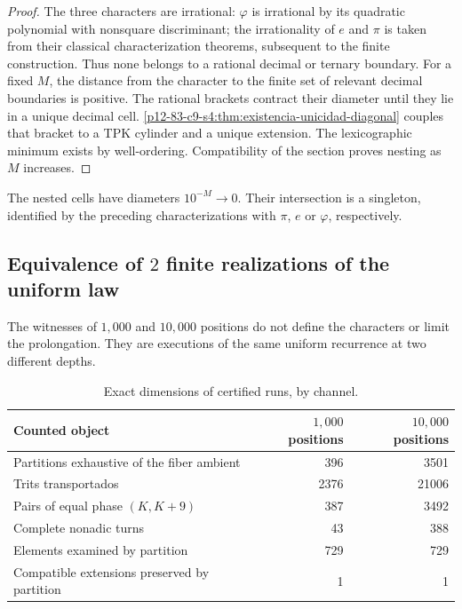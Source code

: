 \begin{proof}
The three characters are irrational: \(\varphi\) is irrational by its quadratic
polynomial with nonsquare discriminant; the irrationality of \(e\) and
\(\pi\) is taken from their classical characterization theorems, subsequent to
the finite construction. Thus none belongs to a rational decimal or
ternary boundary. For a fixed \(M\), the distance from the character to the finite
set of relevant decimal boundaries is positive. The rational
brackets contract their diameter until they lie in a unique decimal cell.
\cref{p12-83-c9-s4:thm:existencia-unicidad-diagonal} couples that bracket to a
TPK cylinder and a unique extension. The lexicographic minimum exists by
well-ordering. Compatibility of the section proves nesting as
\(M\) increases.
\end{proof}

\begin{corollary}
The nested cells have diameters \(10^{-M}\to0\). Their intersection is
a singleton, identified by the preceding characterizations with
\(\pi\), \(e\) or \(\varphi\), respectively.
\end{corollary}

\subsection{Equivalence of \(2\) finite realizations of the uniform law}

The witnesses of \(1,000\) and \(10,000\) positions do not define the
characters or limit the prolongation. They are executions of the same uniform
recurrence at two different depths.

\begin{table}[htbp]
\centering
\caption{Exact dimensions of certified runs, by channel.}
\label{p12-83-c9-s4:tab:dimensiones-ejecuciones-1000-10000}
\begin{tabular}{lrr}
\toprule
Counted object & \(1,000\) positions & \(10,000\) positions\\
\midrule
Partitions exhaustive of the fiber ambient & 396 & 3501\\
Trits transportados & 2376 & 21006\\
Pairs of equal phase \((K,K+9)\) & 387 & 3492\\
Complete nonadic turns & 43 & 388\\
Elements examined by partition & 729 & 729\\
Compatible extensions preserved by partition & 1 & 1\\
\bottomrule
\end{tabular}
\end{table}

